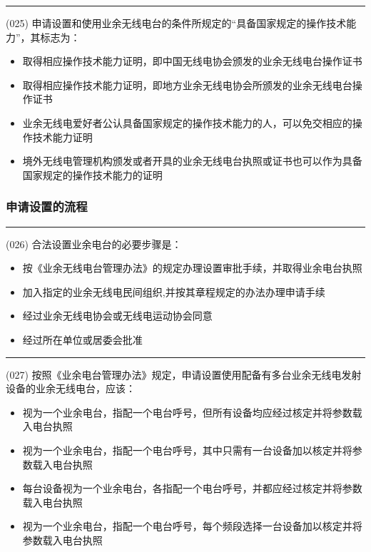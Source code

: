 \documentclass[twocolumn,hyperref,UTF8]{ctexart}  %
\begin{document}
\noindent\rule{0.5\textwidth}{1pt}
\heiti (025) 申请设置和使用业余无线电台的条件所规定的“具备国家规定的操作技术能力”，其标志为： \songti {\color{gray} [LK0043] }
\begin{itemize}
	\item  取得相应操作技术能力证明，即中国无线电协会颁发的业余无线电台操作证书
	\item  取得相应操作技术能力证明，即{\color{red}地方}业余无线电协会所颁发的业余无线电台操作证书
	\item  业余无线电爱好者{\color{red}公认}具备国家规定的操作技术能力的人，可以免交相应的操作技术能力证明
	\item  {\color{red}境外}无线电管理机构颁发或者开具的业余无线电台执照或证书也可以作为具备国家规定的操作技术能力的证明
\end{itemize}


\subsubsection{申请设置的流程}


\noindent\rule{0.5\textwidth}{1pt}
\heiti (026) 合法设置业余电台的必要步骤是： \songti {\color{gray} [LK0006] }
\begin{itemize}
	\item  按《业余无线电台管理办法》的规定办理设置审批手续，并取得业余电台执照
	\item  加入指定的业余无线电民间组织,并按其章程规定的办法办理申请手续
	\item  经过业余无线电协会或无线电运动协会同意
	\item  经过所在单位或居委会批准
\end{itemize}


\noindent\rule{0.5\textwidth}{1pt}
\heiti (027) 按照《业余电台管理办法》规定，申请设置使用配备有多台业余无线电发射设备的业余无线电台，应该： \songti {\color{gray} [LK0010] }
\begin{itemize}
	\item  视为一个业余电台，指配一个电台呼号，但所有设备均应经过核定并将参数载入电台执照
	\item  视为一个业余电台，指配一个电台呼号，其中{\color{red}只需有一台}设备加以核定并将参数载入电台执照
	\item  {\color{red}每台设备视为一个业余电台，各指配一个电台呼号}，并都应经过核定并将参数载入电台执照
	\item  视为一个业余电台，指配一个电台呼号，{\color{red}每个频段选择一台}设备加以核定并将参数载入电台执照
\end{itemize}
\end{document}
